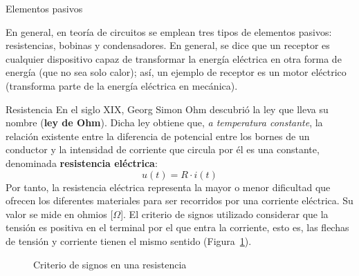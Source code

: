 \documentclass[11pt]{book} %
\makeatletter
\numberwithin{dummy}{section}
\theoremstyle{ocrenumbox}
\theoremstyle{blacknumex}
\theoremstyle{blacknumbox}
\theoremstyle{ocrenum}
\renewcommand{\subsection}{\@startsection {subsection}{2}{\z@}
{-3ex \@plus -0.1ex \@minus -.4ex}
{0.5ex \@plus.2ex }
{\normalfont\sffamily\bfseries}}
\renewcommand{\subsubsection}{\@startsection {subsubsection}{3}{\z@}
{-2ex \@plus -0.1ex \@minus -.2ex}
{.2ex \@plus.2ex }
{\normalfont\small\sffamily\bfseries}}
\makeatother
\begin{document}
	
	
	
	
	\subsection{Elementos pasivos}\label{sec.elementos_pasivos}
	
	
	En general, en teoría de circuitos se emplean tres tipos de elementos pasivos: resistencias, bobinas y condensadores. En general, se dice que un receptor es cualquier dispositivo capaz de transformar la energía eléctrica en otra forma de energía (que no sea solo calor); así, un ejemplo de receptor es un motor eléctrico (transforma parte de la energía eléctrica en mecánica).  
	
	\subsubsection{Resistencia}
	En el siglo XIX, Georg Simon Ohm descubrió la ley que lleva su nombre (\textbf{ley de Ohm}). Dicha ley obtiene que, \textit{a temperatura constante}, la relación existente entre la diferencia de potencial entre los bornes de un conductor y la intensidad de corriente que circula por él es una constante, denominada \textbf{resistencia eléctrica}:
	\begin{equation*}
		\boxed{u(t)=R\cdot i(t)}
	\end{equation*}
	Por tanto, la resistencia eléctrica representa la mayor o menor dificultad que ofrecen los diferentes materiales para ser recorridos por una corriente eléctrica. Su valor se mide en ohmios [$\Omega$]. El criterio de signos utilizado considerar que la tensión es positiva en el terminal por el que entra la corriente, esto es, las flechas de tensión y corriente tienen el mismo sentido (Figura~\ref{fig.resistencia}).
	\begin{figure}[htbp]
		\centering
		\hfil
		\caption{Criterio de signos en una resistencia}
		\label{fig.resistencia}
	\end{figure}
	
\end{document}
